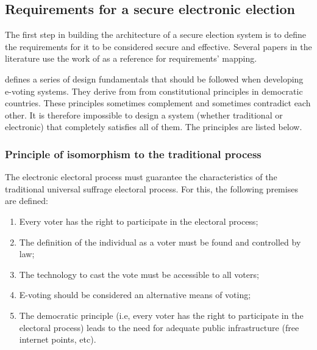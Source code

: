 \documentclass[english]{textolivre}
\begin{document}
\subsection{Requirements for a secure electronic election \label{sec-requirements}}

The first step in building the architecture of a secure election system is to define the requirements for it to be considered secure and effective. Several papers in the literature \cite{Lekkas, Sampigethaya, Hardwick} use the work of \textcite{Gritzalis} as a reference for requirements’ mapping.

\textcite{Gritzalis} defines a series of design fundamentals that should be followed when developing e-voting systems. They derive from from constitutional principles in democratic countries. These principles sometimes complement and sometimes contradict each other. It is therefore impossible to design a system (whether traditional or electronic) that completely satisfies all of them. The principles are listed below.

\subsubsection{Principle of isomorphism to the traditional process \label{sec-Principle-Isomorphism}}

The electronic electoral process must guarantee the characteristics of the traditional universal suffrage electoral process. For this, the following premises are defined:

\begin{enumerate}


\item Every voter has the right to participate in the electoral process;

\item The definition of the individual as a voter must be found and controlled by law;

\item The technology to cast the vote must be accessible to all voters;

\item E-voting should be considered an alternative means of voting;

\item The democratic principle (i.e, every voter has the right to participate in the electoral process) leads to the need for adequate public infrastructure (free internet points, etc).

\end{enumerate}
\end{document}
